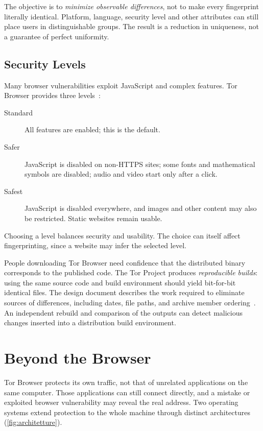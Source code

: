 The objective is to \emph{minimize observable differences}, not to make every fingerprint literally identical. Platform, language, security level and other attributes can still place users in distinguishable groups. The result is a reduction in uniqueness, not a guarantee of perfect uniformity.

\subsection{Security Levels}

Many browser vulnerabilities exploit JavaScript and complex features. Tor Browser provides three levels~\cite{tbmanual}:
\begin{description}
  \item[Standard] All features are enabled; this is the default.
  \item[Safer] JavaScript is disabled on non-HTTPS sites; some fonts and mathematical symbols are disabled; audio and video start only after a click.
  \item[Safest] JavaScript is disabled everywhere, and images and other content may also be restricted. Static websites remain usable.
\end{description}
Choosing a level balances security and usability. The choice can itself affect fingerprinting, since a website may infer the selected level.

\begin{approfondimento}
People downloading Tor Browser need confidence that the distributed binary corresponds to the published code. The Tor Project produces \emph{reproducible builds}: using the same source code and build environment should yield bit-for-bit identical files. The design document describes the work required to eliminate sources of differences, including dates, file paths, and archive member ordering~\cite{perry2018torbrowser}. An independent rebuild and comparison of the outputs can detect malicious changes inserted into a distribution build environment.
\end{approfondimento}

\section{Beyond the Browser}\label{sec:browser-sistemi}

Tor Browser protects its own traffic, not that of unrelated applications on the same computer. Those applications can still connect directly, and a mistake or exploited browser vulnerability may reveal the real address. Two operating systems extend protection to the whole machine through distinct architectures (\cref{fig:architetture}).

